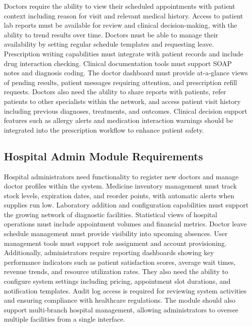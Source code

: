 \justifying
\noindent Doctors require the ability to view their scheduled appointments with patient context including reason for visit and relevant medical history. Access to patient lab reports must be available for review and clinical decision-making, with the ability to trend results over time. Doctors must be able to manage their availability by setting regular schedule templates and requesting leave. Prescription writing capabilities must integrate with patient records and include drug interaction checking. Clinical documentation tools must support SOAP notes and diagnosis coding. The doctor dashboard must provide at-a-glance views of pending results, patient messages requiring attention, and prescription refill requests. Doctors also need the ability to share reports with patients, refer patients to other specialists within the network, and access patient visit history including previous diagnoses, treatments, and outcomes. Clinical decision support features such as allergy alerts and medication interaction warnings should be integrated into the prescription workflow to enhance patient safety.

\subsection{Hospital Admin Module Requirements}

\justifying
\noindent Hospital administrators need functionality to register new doctors and manage doctor profiles within the system. Medicine inventory management must track stock levels, expiration dates, and reorder points, with automatic alerts when supplies run low. Laboratory addition and configuration capabilities must support the growing network of diagnostic facilities. Statistical views of hospital operations must include appointment volumes and financial metrics. Doctor leave schedule management must provide visibility into upcoming absences. User management tools must support role assignment and account provisioning. Additionally, administrators require reporting dashboards showing key performance indicators such as patient satisfaction scores, average wait times, revenue trends, and resource utilization rates. They also need the ability to configure system settings including pricing, appointment slot durations, and notification templates. Audit log access is required for reviewing system activities and ensuring compliance with healthcare regulations. The module should also support multi-branch hospital management, allowing administrators to oversee multiple facilities from a single interface.

